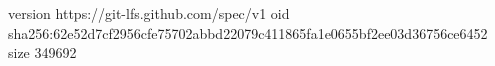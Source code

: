 version https://git-lfs.github.com/spec/v1
oid sha256:62e52d7cf2956cfe75702abbd22079c411865fa1e0655bf2ee03d36756ce6452
size 349692
